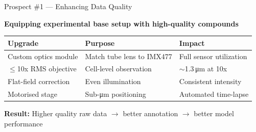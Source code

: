 \documentclass[aspectratio=169,11pt]{beamer}
\begin{document}
\begin{frame}{Prospect \#1 --- Enhancing Data Quality}

  \textbf{Equipping experimental base setup with high-quality compounds}

  \vspace{0.5em}

  \begin{tabular}{@{}lll@{}}
    \toprule
    \textbf{Upgrade} & \textbf{Purpose} & \textbf{Impact} \\
    \midrule
    Custom optics module   & Match tube lens to IMX477  & Full sensor utilization \\
    $\leq$10x RMS objective & Cell-level observation     & $\sim$1.3\,\si{\micro\meter} at 10x \\
    Flat-field correction  & Even illumination          & Consistent intensity \\
    Motorised stage        & Sub-\si{\micro\meter} positioning & Automated time-lapse \\
    \bottomrule
  \end{tabular}

  \vfill
  \textbf{Result:} Higher quality raw data $\rightarrow$ better annotation $\rightarrow$ better model performance

\end{frame}
\end{document}
